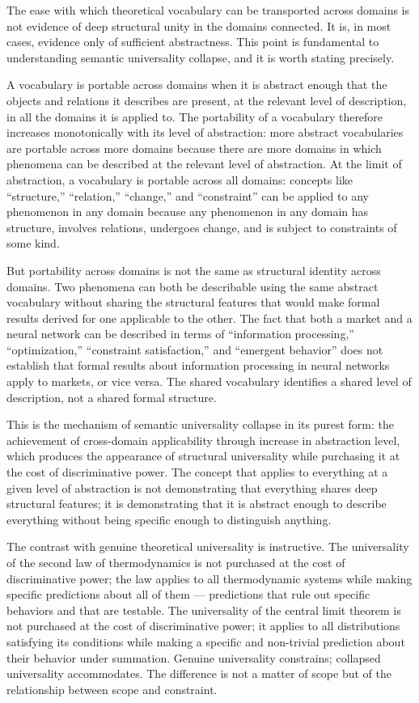 \documentclass[12pt, openright, twoside]{book}
\begin{document}
The ease with which theoretical vocabulary can be
transported across domains is not evidence of deep
structural unity in the domains connected. It is,
in most cases, evidence only of sufficient
abstractness. This point is fundamental to
understanding semantic universality collapse, and
it is worth stating precisely.

A vocabulary is portable across domains when it
is abstract enough that the objects and relations
it describes are present, at the relevant level
of description, in all the domains it is applied
to. The portability of a vocabulary therefore
increases monotonically with its level of
abstraction: more abstract vocabularies are
portable across more domains because there are
more domains in which phenomena can be described
at the relevant level of abstraction. At the
limit of abstraction, a vocabulary is portable
across all domains: concepts like ``structure,''
``relation,'' ``change,'' and ``constraint'' can
be applied to any phenomenon in any domain because
any phenomenon in any domain has structure, involves
relations, undergoes change, and is subject to
constraints of some kind.

But portability across domains is not the same
as structural identity across domains. Two phenomena
can both be describable using the same abstract
vocabulary without sharing the structural features
that would make formal results derived for one
applicable to the other. The fact that both a
market and a neural network can be described in
terms of ``information processing,'' ``optimization,''
``constraint satisfaction,'' and ``emergent behavior''
does not establish that formal results about
information processing in neural networks apply
to markets, or vice versa. The shared vocabulary
identifies a shared level of description, not a
shared formal structure.

This is the mechanism of semantic universality
collapse in its purest form: the achievement of
cross-domain applicability through increase in
abstraction level, which produces the appearance
of structural universality while purchasing it
at the cost of discriminative power. The concept
that applies to everything at a given level of
abstraction is not demonstrating that everything
shares deep structural features; it is demonstrating
that it is abstract enough to describe everything
without being specific enough to distinguish
anything.

The contrast with genuine theoretical universality
is instructive. The universality of the second
law of thermodynamics is not purchased at the
cost of discriminative power; the law applies
to all thermodynamic systems while making specific
predictions about all of them --- predictions that
rule out specific behaviors and that are testable.
The universality of the central limit theorem
is not purchased at the cost of discriminative
power; it applies to all distributions satisfying
its conditions while making a specific and
non-trivial prediction about their behavior
under summation. Genuine universality constrains;
collapsed universality accommodates. The
difference is not a matter of scope but of
the relationship between scope and constraint.
\end{document}
